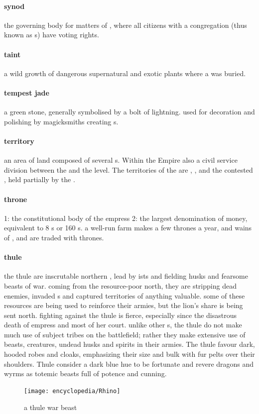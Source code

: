 \paragraph{synod} the governing body for matters of , where all citizens with a congregation (thus known as s) have voting rights.
\paragraph{taint} a wild growth of dangerous supernatural and exotic plants where a  was buried.
\paragraph{tempest jade} a green stone, generally symbolised by a bolt of lightning. used for decoration and polishing by magicksmiths creating s.
\paragraph{territory} an area of land composed of several s. Within the Empire also a civil service division between the  and the  level. The territories of the  are , ,  and the contested , held partially by the .
\paragraph{throne} 1: the constitutional body of the empress 2: the largest denomination of money, equivalent to 8 s or 160 s. a well-run farm makes a few thrones a year, and wains of ,  and  are traded with thrones. 
\paragraph{thule} the thule are inscrutable northern , lead by ists and fielding husks and fearsome beasts of war. coming from the resource-poor north, they are stripping dead enemies, invaded s and captured territories of anything valuable. some of these resources are being used to reinforce their armies, but the lion's share is being sent north. fighting against the thule is fierce, especially since the disastrous death of empress  and most of her court. unlike other s, the thule do not make much use of subject tribes on the battlefield; rather they make extensive use of beasts, creatures, undead husks and spirits in their armies. The thule favour dark, hooded robes and cloaks, emphasizing their size and bulk with fur pelts over their shoulders. Thule consider a dark blue hue to be fortunate and revere dragons and wyrms as totemic beasts full of potence and cunning.\begin{figure}\centering\texttt{[image: encyclopedia/Rhino]}\caption{a thule war beast}\end{figure}
